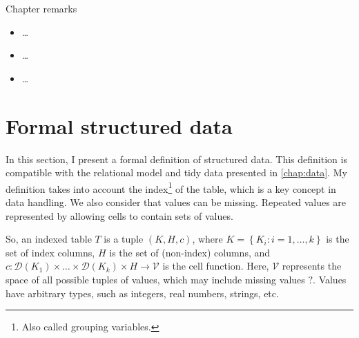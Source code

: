 \begin{mainbox}{Chapter remarks}


  \startcontents[chapters]
  \vspace{1em}


  \begin{itemize}
    \item \dots
  \end{itemize}


  \begin{itemize}
    \item \dots
  \end{itemize}


  \begin{itemize}
    \item \dots
  \end{itemize}
\end{mainbox}

{}
\clearpage

\section{Formal structured data}

\newcommand{\domainof}[1]{\mathcal{D}\!\left(#1\right)}
\newcommand{\missing}{\text{?}}
\newcommand{\rowcard}[1][k_1, \dots, k_k]{\operatorname{card}\!\left(#1\right)}

In this section, I present a formal definition of structured data.  This definition is
compatible with the relational model and tidy data presented in \cref{chap:data}.
My definition takes into account the index\footnote{Also called grouping variables.} of
the table, which is a key concept in data handling.  We also consider that values can be
missing.  Repeated values are represented by allowing cells to contain sets of values.

So, an indexed table $T$ is a tuple $(K, H, c)$, where $K = \left\{K_i : i = 1, \dots,
k\right\}$ is the set of index columns, $H$ is the set of (non-index) columns, and $c :
\domainof{K_1} \times \dots \times \domainof{K_k} \times H \to \mathcal{V}$ is the cell function.
Here, $\mathcal{V}$ represents the space of all possible tuples of values, which
may include missing values $\missing$.  Values have arbitrary types, such as integers,
real numbers, strings, etc.

